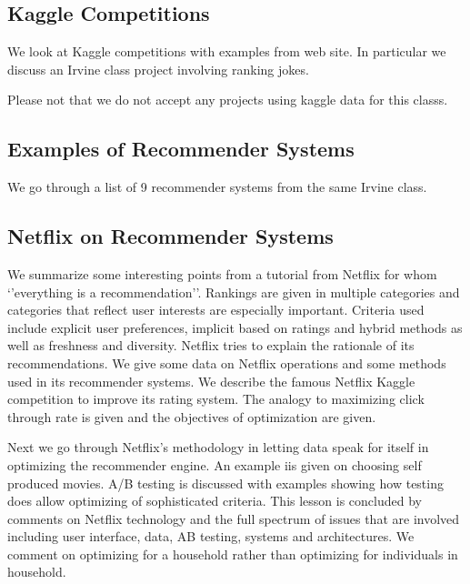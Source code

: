 

\subsection{Kaggle Competitions}

We look at Kaggle competitions with examples from web site. In
particular we discuss an Irvine class project involving ranking jokes.


\begin{IU}

Please not that we do not accept any projects using kaggle data for
this classs.

\end{IU}

\subsection{Examples of Recommender Systems}

We go through a list of 9 recommender systems from the same Irvine
class.



\subsection{Netflix on Recommender Systems}

We summarize some interesting points from a tutorial from Netflix for
whom `'everything is a recommendation''. Rankings are given in multiple
categories and categories that reflect user interests are especially
important. Criteria used include explicit user preferences, implicit
based on ratings and hybrid methods as well as freshness and diversity.
Netflix tries to explain the rationale of its recommendations. We give
some data on Netflix operations and some methods used in its recommender
systems. We describe the famous Netflix Kaggle competition to improve
its rating system. The analogy to maximizing click through rate is given
and the objectives of optimization are given.


Next we go through Netflix's methodology in letting data speak for
itself in optimizing the recommender engine. An example iis given on
choosing self produced movies. A/B testing is discussed with examples
showing how testing does allow optimizing of sophisticated criteria.
This lesson is concluded by comments on Netflix technology and the full
spectrum of issues that are involved including user interface, data, AB
testing, systems and architectures. We comment on optimizing for a
household rather than optimizing for individuals in household.

